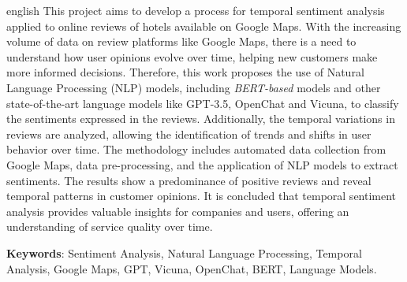 \begin{resumo}[Abstract]
 \begin{otherlanguage*}{english}
    This project aims to develop a process for temporal sentiment analysis applied to online reviews of hotels available on Google Maps. With the increasing volume of data on review platforms like Google Maps, there is a need to understand how user opinions evolve over time, helping new customers make more informed decisions. Therefore, this work proposes the use of Natural Language Processing (NLP) models, including \textit{BERT-based} models and other state-of-the-art language models like GPT-3.5, OpenChat and Vicuna, to classify the sentiments expressed in the reviews. Additionally, the temporal variations in reviews are analyzed, allowing the identification of trends and shifts in user behavior over time. The methodology includes automated data collection from Google Maps, data pre-processing, and the application of NLP models to extract sentiments. The results show a predominance of positive reviews and reveal temporal patterns in customer opinions. It is concluded that temporal sentiment analysis provides valuable insights for companies and users, offering an understanding of service quality over time.

   \vspace{\onelineskip}
 
   \noindent 
   \textbf{Keywords}: Sentiment Analysis, Natural Language Processing, Temporal Analysis, Google Maps, GPT, Vicuna, OpenChat, BERT, Language Models.
 \end{otherlanguage*}
\end{resumo}